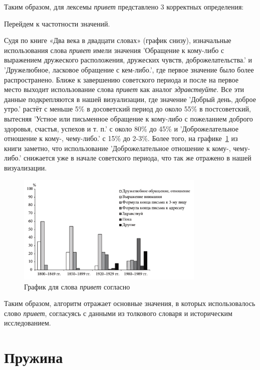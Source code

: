 Таким образом, для лексемы \textit{привет} представлено 3 корректных определения:

Перейдем к частотности значений.

Судя по книге «Два века в двадцати словах» (график снизу), изначальные использования слова \textit{привет}
имели значения ’Обращение к кому-либо с выражением дружеского расположения,
дружеских чувств, доброжелательства.’ и ’Дружелюбное, ласковое обращение с кем-либо.’,
где первое значение было более распространено.
Ближе к завершению советского периода и после на первое место выходит использование
слова \textit{привет} как аналог \textit{здравствуйте}.
Все эти данные подкрепляются в нашей визуализации, где значение ’Добрый день, доброе утро.’
растёт с меньше 5\% в досоветский период до около 55\% в постсоветский, вытесняя
’Устное или письменное обращение к кому-либо с пожеланием доброго здоровья, счастья, успехов и т. п.’
с около 80\% до 45\% и ’Доброжелательное отношение к кому-, чему-либо.’ с 15\% до 2-3\%.
Более того, на графике~\ref{fig:TwoCenturiesPrivet} из книги заметно, что использование ’Доброжелательное отношение к кому-, чему-либо.’
снижается уже в начале советского периода, что так же отражено в нашей визуализации.

\begin{figure}[H]
    \centering %
    \includegraphics[width=0.8\textwidth]{img/book/privet/all}
    \caption{График для слова \textit{привет} согласно~\cite{TwoCenturies}}
    \label{fig:TwoCenturiesPrivet}
\end{figure}

Таким образом, алгоритм отражает основные значения, в которых использовалось
слово \textit{привет}, согласуясь с данными из толкового словаря и историческим исследованием.

\section*{Пружина}


